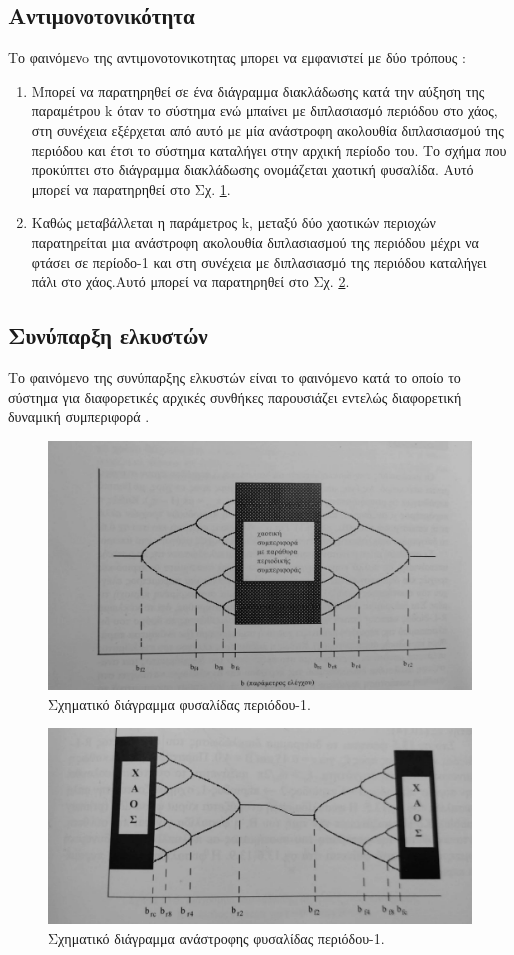 \subsection{Aντιμονοτονικότητα}
Το φαινόμενo της αντιμονοτονικοτητας μπορει να εμφανιστεί με δύο τρόπους \cite{b5} :
\begin{enumerate}
	
	\item Μπορεί να παρατηρηθεί σε ένα διάγραμμα διακλάδωσης κατά την αύξηση της παραμέτρου k όταν το σύστημα ενώ μπαίνει με διπλασιασμό περιόδου στο χάος, στη συνέχεια εξέρχεται από αυτό με μία ανάστροφη ακολουθία διπλασιασμού της περιόδου και έτσι το σύστημα καταλήγει στην αρχική περίοδο του. Το σχήμα που προκύπτει στο διάγραμμα διακλάδωσης ονομάζεται χαοτική φυσαλίδα. Αυτό μπορεί να παρατηρηθεί στο Σχ. \ref{th:g3}.
	
	\item  Καθώς μεταβάλλεται η παράμετρος k, μεταξύ δύο χαοτικών περιοχών παρατηρείται μια ανάστροφη ακολουθία διπλασιασμού της περιόδου μέχρι να φτάσει σε περίοδο-1 και στη συνέχεια με διπλασιασμό της περιόδου καταλήγει πάλι στο χάος.Αυτό μπορεί να παρατηρηθεί στο Σχ. \ref{th:g4}.
	
\end{enumerate}


\subsection{Συνύπαρξη ελκυστών}
Το φαινόμενο της συνύπαρξης ελκυστών είναι το φαινόμενο κατά το οποίο το σύστημα για διαφορετικές αρχικές συνθήκες παρουσιάζει εντελώς διαφορετική δυναμική συμπεριφορά \cite{b5}.

\begin{figure}[ht]
	\centering
	\includegraphics[width=1\linewidth]{LateX images/antimon1}
	\caption{ Σχηματικό διάγραμμα φυσαλίδας περιόδου-1.}
	\label{th:g3}	
\end{figure}

\begin{figure}[ht]
	\centering
	\includegraphics[width=1\linewidth]{LateX images/antimon2}
	\caption{ Σχηματικό διάγραμμα ανάστροφης φυσαλίδας περιόδου-1.}
	\label{th:g4}	
\end{figure}
\clearpage

